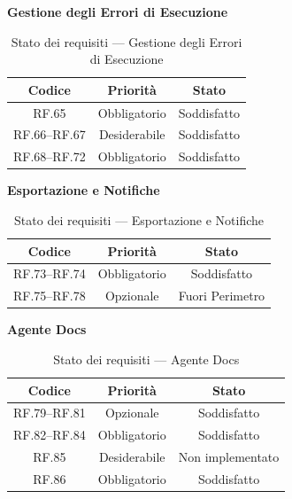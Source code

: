 \documentclass[12pt, a4paper]{article}
\begin{document}
\medskip
\noindent\textbf{Gestione degli Errori di Esecuzione}
\medskip

\begin{table}[H]
    \centering
    \renewcommand{\arraystretch}{1.3}
    \begin{tabular}{|c|c|c|}
        \hline
        \textbf{Codice} & \textbf{Priorità} & \textbf{Stato} \\ \hline
        RF.65 & Obbligatorio & Soddisfatto \\ \hline
        RF.66--RF.67 & Desiderabile & Soddisfatto \\ \hline
        RF.68--RF.72 & Obbligatorio & Soddisfatto \\ \hline
    \end{tabular}
    \caption{Stato dei requisiti — Gestione degli Errori di Esecuzione}
    \label{tab:req-errori}
\end{table}

\medskip
\noindent\textbf{Esportazione e Notifiche}
\medskip

\begin{table}[H]
    \centering
    \renewcommand{\arraystretch}{1.3}
    \begin{tabular}{|c|c|c|}
        \hline
        \textbf{Codice} & \textbf{Priorità} & \textbf{Stato} \\ \hline
        RF.73--RF.74 & Obbligatorio & Soddisfatto \\ \hline
        RF.75--RF.78 & Opzionale & Fuori Perimetro \\ \hline
    \end{tabular}
    \caption{Stato dei requisiti — Esportazione e Notifiche}
    \label{tab:req-esportazione}
\end{table}

\medskip
\noindent\textbf{Agente Docs}
\medskip

\begin{table}[H]
    \centering
    \renewcommand{\arraystretch}{1.3}
    \begin{tabular}{|c|c|c|}
        \hline
        \textbf{Codice} & \textbf{Priorità} & \textbf{Stato} \\ \hline
        RF.79--RF.81 & Opzionale & Soddisfatto \\ \hline
        RF.82--RF.84 & Obbligatorio & Soddisfatto \\ \hline
        RF.85 & Desiderabile & Non implementato \\ \hline
        RF.86 & Obbligatorio & Soddisfatto \\ \hline
    \end{tabular}
    \caption{Stato dei requisiti — Agente Docs}
    \label{tab:req-docs}
\end{table}
\end{document}
